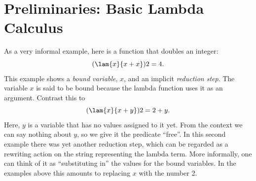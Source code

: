 
\chapter{Preliminaries: Basic Lambda Calculus}

As a very informal example, here is a function that doubles an integer:
\begin{equation*}
	(\lam{x}{x+x})2=4.
\end{equation*}
This example shows a \emph{bound variable}, $x$, and an implicit \emph{reduction step}. The variable $x$
is said to be bound because the lambda function uses it as an argument. Contrast this to
\begin{equation*}
	(\lam{x}{x+y})2=2+y.
\end{equation*}
Here, $y$ is a variable that has no values assigned to it yet. From
the context we can say nothing about $y$, so we give it the predicate
``free''. In this second example there was yet another reduction step, which 
can be regarded as a rewriting action on the string representing the
lambda term. More informally, one can think of it as ``substituting in''
the values for the bound variables. In the examples above this amounts to
replacing $x$ with the number 2.

